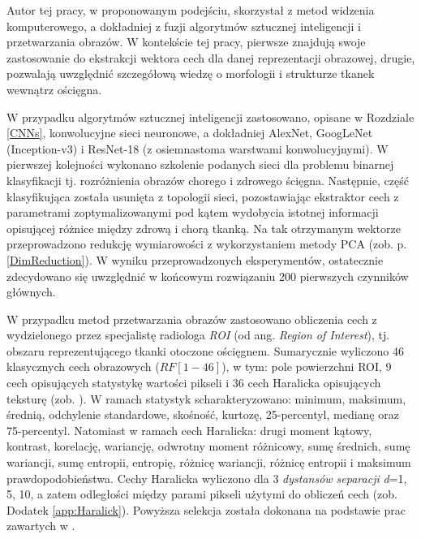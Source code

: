Autor tej pracy, w proponowanym podejściu, skorzystał z metod widzenia komputerowego, a dokładniej z fuzji algorytmów sztucznej inteligencji i przetwarzania obrazów. W kontekście tej pracy, pierwsze znajdują swoje zastosowanie do ekstrakcji wektora cech dla danej reprezentacji obrazowej, drugie, pozwalają uwzględnić szczegółową wiedzę o morfologii i strukturze tkanek wewnątrz ościęgna.

W przypadku algorytmów sztucznej inteligencji zastosowano,  opisane w Rozdziale \ref{CNNs}, konwolucyjne sieci neuronowe, a dokładniej AlexNet, GoogLeNet (Inception-v3) i ResNet-18 (z osiemnastoma warstwami konwolucyjnymi). W pierwszej kolejności wykonano szkolenie podanych sieci dla problemu binarnej klasyfikacji tj. rozróżnienia obrazów chorego i zdrowego ścięgna. Następnie, część klasyfikująca została usunięta z topologii sieci, pozostawiając ekstraktor cech z parametrami zoptymalizowanymi pod kątem wydobycia istotnej informacji opisującej różnice między zdrową i chorą tkanką. Na tak otrzymanym wektorze przeprowadzono redukcję wymiarowości z wykorzystaniem metody PCA (zob. p. \ref{DimReduction}). W wyniku przeprowadzonych eksperymentów, ostatecznie zdecydowano się uwzględnić w końcowym rozwiązaniu 200 pierwszych czynników głównych.

W przypadku metod przetwarzania obrazów zastosowano obliczenia cech z wydzielonego przez specjalistę radiologa \textit{ROI} (od ang. \textit{Region of Interest}), tj. obszaru reprezentującego tkanki otoczone ościęgnem. Sumarycznie wyliczono 46 klasycznych cech obrazowych ($RF[1-46]$), w tym: pole powierzchni ROI, 9 cech opisujących statystykę wartości pikseli i 36 cech Haralicka opisujących teksturę (zob. \cite{Haralick1973}). W ramach statystyk scharakteryzowano: minimum, maksimum, średnią, odchylenie standardowe, skośność, kurtozę, 25-percentyl, medianę oraz 75-percentyl. Natomiast w ramach cech Haralicka: drugi moment kątowy, kontrast, korelację, wariancję, odwrotny moment różnicowy, sumę średnich, sumę wariancji, sumę entropii, entropię, różnicę wariancji, różnicę entropii i maksimum prawdopodobieństwa. Cechy Haralicka wyliczono dla 3 \textit{dystansów separacji} \textit{d}=1, 5, 10, a zatem odległości między parami pikseli użytymi do obliczeń cech (zob. Dodatek \ref{app:Haralick}). Powyższa selekcja została dokonana na podstawie prac zawartych w \cite{Nowosielski17}.  

